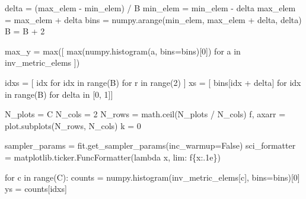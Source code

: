 \documentclass[
  letterpaper,
  DIV=11,
  numbers=noendperiod]{scrartcl}
\newenvironment{Shaded}{\begin{snugshade}}{\end{snugshade}}
\newcommand{\BuiltInTok}[1]{\textcolor[rgb]{0.00,0.23,0.31}{#1}}
\newcommand{\ControlFlowTok}[1]{\textcolor[rgb]{0.00,0.23,0.31}{#1}}
\newcommand{\DecValTok}[1]{\textcolor[rgb]{0.68,0.00,0.00}{#1}}
\newcommand{\KeywordTok}[1]{\textcolor[rgb]{0.00,0.23,0.31}{#1}}
\newcommand{\NormalTok}[1]{\textcolor[rgb]{0.00,0.23,0.31}{#1}}
\newcommand{\OperatorTok}[1]{\textcolor[rgb]{0.37,0.37,0.37}{#1}}
\newcommand{\SpecialCharTok}[1]{\textcolor[rgb]{0.37,0.37,0.37}{#1}}
\newcommand{\SpecialStringTok}[1]{\textcolor[rgb]{0.13,0.47,0.30}{#1}}
\newcommand{\VariableTok}[1]{\textcolor[rgb]{0.07,0.07,0.07}{#1}}
\begin{document}
\begin{Shaded}
\begin{Highlighting}[]
\NormalTok{  delta }\OperatorTok{=}\NormalTok{ (max\_elem }\OperatorTok{{-}}\NormalTok{ min\_elem) }\OperatorTok{/}\NormalTok{ B}
\NormalTok{  min\_elem }\OperatorTok{=}\NormalTok{ min\_elem }\OperatorTok{{-}}\NormalTok{ delta}
\NormalTok{  max\_elem }\OperatorTok{=}\NormalTok{ max\_elem }\OperatorTok{+}\NormalTok{ delta}
\NormalTok{  bins }\OperatorTok{=}\NormalTok{ numpy.arange(min\_elem, max\_elem }\OperatorTok{+}\NormalTok{ delta, delta)}
\NormalTok{  B }\OperatorTok{=}\NormalTok{ B }\OperatorTok{+} \DecValTok{2}

\NormalTok{  max\_y }\OperatorTok{=} \BuiltInTok{max}\NormalTok{([ }\BuiltInTok{max}\NormalTok{(numpy.histogram(a, bins}\OperatorTok{=}\NormalTok{bins)[}\DecValTok{0}\NormalTok{]) }\ControlFlowTok{for}\NormalTok{ a }\KeywordTok{in}\NormalTok{ inv\_metric\_elems ])}
  
\NormalTok{  idxs }\OperatorTok{=}\NormalTok{ [ idx }\ControlFlowTok{for}\NormalTok{ idx }\KeywordTok{in} \BuiltInTok{range}\NormalTok{(B) }\ControlFlowTok{for}\NormalTok{ r }\KeywordTok{in} \BuiltInTok{range}\NormalTok{(}\DecValTok{2}\NormalTok{) ]}
\NormalTok{  xs }\OperatorTok{=}\NormalTok{ [ bins[idx }\OperatorTok{+}\NormalTok{ delta] }\ControlFlowTok{for}\NormalTok{ idx }\KeywordTok{in} \BuiltInTok{range}\NormalTok{(B) }\ControlFlowTok{for}\NormalTok{ delta }\KeywordTok{in}\NormalTok{ [}\DecValTok{0}\NormalTok{, }\DecValTok{1}\NormalTok{]]}

\NormalTok{  N\_plots }\OperatorTok{=}\NormalTok{ C}
\NormalTok{  N\_cols }\OperatorTok{=} \DecValTok{2}
\NormalTok{  N\_rows }\OperatorTok{=}\NormalTok{ math.ceil(N\_plots }\OperatorTok{/}\NormalTok{ N\_cols)}
\NormalTok{  f, axarr }\OperatorTok{=}\NormalTok{ plot.subplots(N\_rows, N\_cols)}
\NormalTok{  k }\OperatorTok{=} \DecValTok{0}
  
\NormalTok{  sampler\_params }\OperatorTok{=}\NormalTok{ fit.get\_sampler\_params(inc\_warmup}\OperatorTok{=}\VariableTok{False}\NormalTok{)}
\NormalTok{  sci\_formatter }\OperatorTok{=}\NormalTok{ matplotlib.ticker.FuncFormatter(}\KeywordTok{lambda}\NormalTok{ x, lim: }\SpecialStringTok{f\textquotesingle{}}\SpecialCharTok{\{}\NormalTok{x}\SpecialCharTok{:.1e\}}\SpecialStringTok{\textquotesingle{}}\NormalTok{)}
  
  \ControlFlowTok{for}\NormalTok{ c }\KeywordTok{in} \BuiltInTok{range}\NormalTok{(C):}
\NormalTok{    counts }\OperatorTok{=}\NormalTok{ numpy.histogram(inv\_metric\_elems[c], bins}\OperatorTok{=}\NormalTok{bins)[}\DecValTok{0}\NormalTok{]}
\NormalTok{    ys }\OperatorTok{=}\NormalTok{ counts[idxs]}
    

\end{Highlighting}
\end{Shaded}
\end{document}
